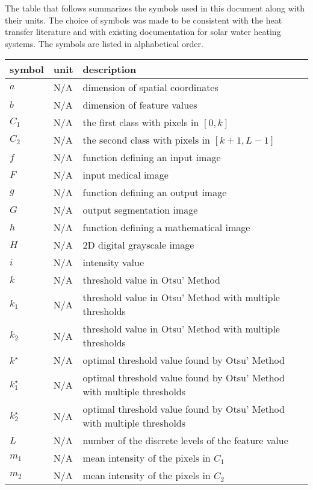 \documentclass[12pt]{article}
\begin{document}
The table that follows summarizes the symbols used in this document along with
their units.  The choice of symbols was made to be consistent with the heat
transfer literature and with existing documentation for solar water heating
systems.  The symbols are listed in alphabetical order.

\renewcommand{\arraystretch}{1.2}
\noindent \begin{longtable*}{l l p{12cm}} \toprule
\textbf{symbol} & \textbf{unit} & \textbf{description}\\
\midrule 
$a$ & N/A & dimension of spatial coordinates
\\
$b$ & N/A & dimension of feature values
\\
$C_{1}$ & N/A & the first class with pixels in $[0, k]$
\\
$C_{2}$ & N/A & the second class with pixels in $[k+1, L-1]$
\\
$f$ & N/A & function defining an input image
\\
$F$ & N/A & input medical image
\\
$g$ & N/A & function defining an output image
\\
$G$ & N/A & output segmentation image
\\
$h$ & N/A & function defining a mathematical image
\\
$H$ & N/A & 2D digital grayscale image
\\
$i$ & N/A & intensity value
\\
$k$ & N/A & threshold value in Otsu' Method
\\
$k_{1}$ & N/A & threshold value in Otsu' Method with multiple thresholds
\\
$k_{2}$ & N/A & threshold value in Otsu' Method with multiple thresholds
\\
$k^{\star}$ & N/A & optimal  threshold  value found by Otsu' Method
\\
$k^{\star}_{1}$ & N/A & optimal  threshold  value found by Otsu' Method with multiple thresholds
\\
$k^{\star}_{2}$ & N/A & optimal  threshold  value found by Otsu' Method with multiple thresholds
\\
$L$ & N/A & number  of  the  discrete  levels  of  the  feature value
\\
$m_{1}$ & N/A & mean intensity of the pixels in $C_{1}$
\\
$m_{2}$ & N/A & mean intensity of the pixels in $C_{2}$
\\

\end{longtable*}
\end{document}
